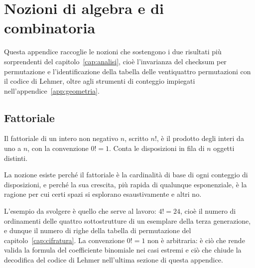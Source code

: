 
\chapter{Nozioni di algebra e di combinatoria}
\label{app:algebra}

Questa appendice raccoglie le nozioni che sostengono i due risultati più sorprendenti del capitolo~\ref{cap:analisi}, cioè l'invarianza del checksum per permutazione e l'identificazione della tabella delle ventiquattro permutazioni con il codice di Lehmer, oltre agli strumenti di conteggio impiegati nell'appendice~\ref{app:geometria}.

\section{Fattoriale}

Il fattoriale di un intero non negativo $n$, scritto $n!$, è il prodotto degli interi da uno a $n$, con la convenzione $0! = 1$. Conta le disposizioni in fila di $n$ oggetti distinti.

La nozione esiste perché il fattoriale è la cardinalità di base di ogni conteggio di disposizioni, e perché la sua crescita, più rapida di qualunque esponenziale, è la ragione per cui certi spazi si esplorano esaustivamente e altri no.

L'esempio da svolgere è quello che serve al lavoro: $4! = 24$, cioè il numero di ordinamenti delle quattro sottostrutture di un esemplare della terza generazione, e dunque il numero di righe della tabella di permutazione del capitolo~\ref{cap:cifratura}. La convenzione $0! = 1$ non è arbitraria: è ciò che rende valida la formula del coefficiente binomiale nei casi estremi e ciò che chiude la decodifica del codice di Lehmer nell'ultima sezione di questa appendice.

